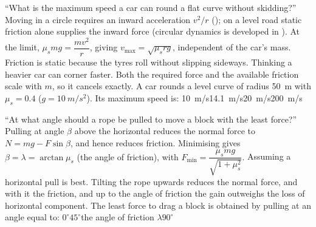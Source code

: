 {``What is the maximum speed a car can round a flat curve without skidding?''}
{Moving in a circle requires an inward acceleration $v^2/r$ (); on a level road
static friction alone supplies the inward force (circular dynamics is developed in ).
At the limit, $\mu_s mg=\dfrac{mv^2}{r}$, giving $\boxed{v_{\max}=\sqrt{\mu_s rg}}$, independent of the
car's mass. Friction is static because the tyres roll without slipping sideways.}
{Thinking a heavier car can corner faster. Both the required force and the available friction scale with
$m$, so it cancels exactly.}
{A car rounds a level curve of radius \SI{50}{m} with $\mu_s=0.4$ ($g=\SI{10}{m/s^2}$). Its maximum
speed is:}
{\SI{10}{m/s}}{\SI{14.1}{m/s}}{\SI{20}{m/s}}{\SI{200}{m/s}}

{``At what angle should a rope be pulled to move a block with the least force?''}
{Pulling at angle $\beta$ above the horizontal reduces the normal force to $N=mg-F\sin\beta$, and hence
reduces friction. Minimising gives $\beta=\lambda=\arctan\mu_s$ (the angle of friction), with
$F_{\min}=\dfrac{\mu_s mg}{\sqrt{1+\mu_s^2}}$.}
{Assuming a horizontal pull is best. Tilting the rope upwards reduces the normal force, and with it the
friction, and up to the angle of friction the gain outweighs the loss of horizontal component.}
{The least force to drag a block is obtained by pulling at an angle equal to:}
{$0^\circ$}{$45^\circ$}{the angle of friction $\lambda$}{$90^\circ$}
